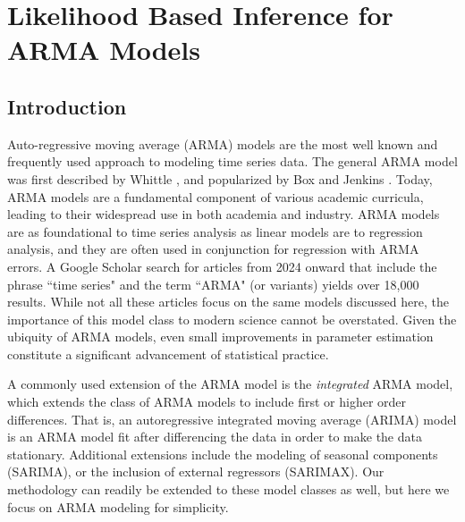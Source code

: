 \chapter{Likelihood Based Inference for ARMA Models}
\label{chpt:arima}





\section{Introduction}
\label{sec:intro}

Auto-regressive moving average (ARMA) models are the most well known and frequently used approach to modeling time series data.
The general ARMA model was first described by Whittle \cite{whittle51}, and popularized by Box and Jenkins \cite{box1970}.
Today, ARMA models are a fundamental component of various academic curricula, leading to their widespread use in both academia and industry.
ARMA models are as foundational to time series analysis as linear models are to regression analysis, and they are often used in conjunction for regression with ARMA errors.
A Google Scholar search for articles from 2024 onward that include the phrase ``time series" and the term ``ARMA" (or variants) yields over 18,000 results.
While not all these articles focus on the same models discussed here, the importance of this model class to modern science cannot be overstated.
Given the ubiquity of ARMA models, even small improvements in parameter estimation constitute a significant advancement of statistical practice.

A commonly used extension of the ARMA model is the \emph{integrated} ARMA model, which extends the class of ARMA models to include first or higher order differences.
That is, an autoregressive integrated moving average (ARIMA) model is an ARMA model fit after differencing the data in order to make the data stationary.
Additional extensions include the modeling of seasonal components (SARIMA), or the inclusion of external regressors (SARIMAX).
Our methodology can readily be extended to these model classes as well, but here we focus on ARMA modeling for simplicity.

